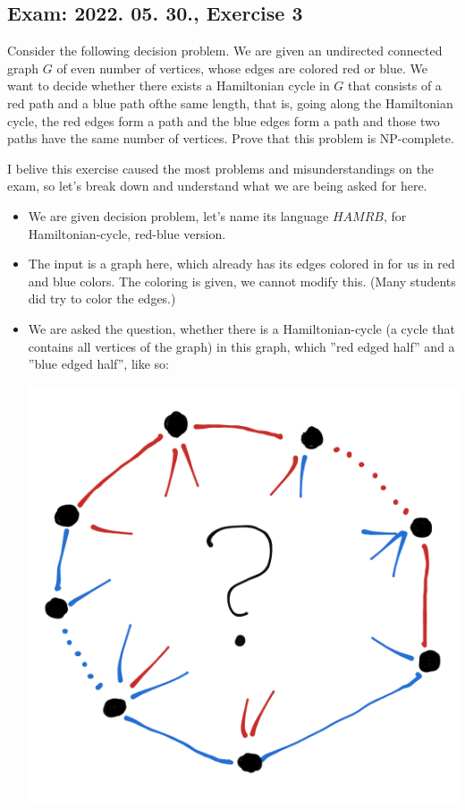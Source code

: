 \subsection{Exam: 2022. 05. 30., Exercise 3}


Consider the following decision problem. We are given an undirected connected
graph $G$ of even number of vertices, whose edges are colored red or blue.
We want to decide whether there exists a Hamiltonian cycle in $G$ that consists
of a red path and a blue path ofthe same length, that is, going along the
Hamiltonian cycle, the red edges form a path and the blue edges form a path
and those two paths have the same number of vertices. Prove that this problem
is NP-complete.


I belive this exercise caused the most problems and misunderstandings on the exam,
so let's break down and understand what we are being asked for here.

\begin{itemize}
\item We are given decision problem, let's name its language $HAMRB$, for Hamiltonian-cycle, red-blue version.
\item The input is a graph here, which already has its edges colored in for us in red and blue colors. The coloring is given, we cannot modify this. (Many students did try to color the edges.)
\item We are asked the question, whether there is a Hamiltonian-cycle (a cycle that contains all vertices of the graph) in this graph, which ''red edged half'' and a ''blue edged half'', like so:

\begin{center}
\includegraphics[width=\linewidth]{./exams/2022_05_30/03/hamrb.png}
\end{center}

\end{itemize}